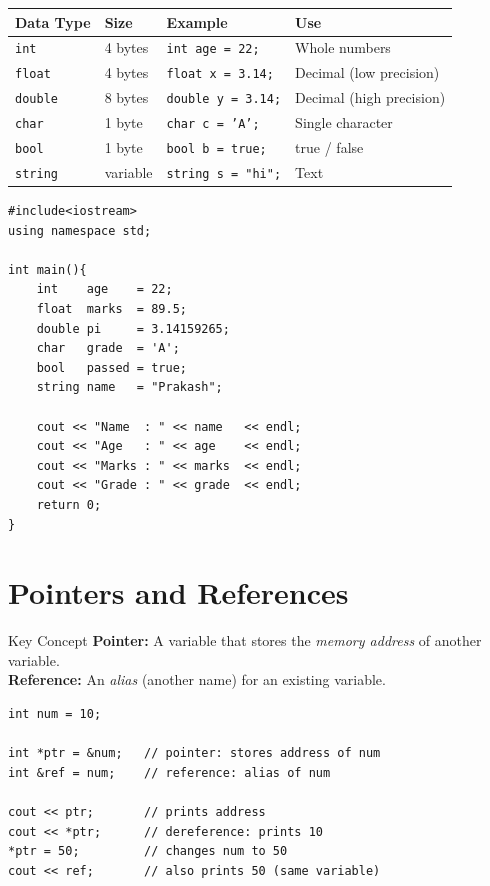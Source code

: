 \documentclass[12pt,a4paper]{report}
\begin{document}
\begin{center}
\begin{tabular}{|l|l|l|l|}
\hline
\textbf{Data Type} & \textbf{Size} & \textbf{Example} & \textbf{Use} \\
\hline
\texttt{int}    & 4 bytes  & \texttt{int age = 22;}     & Whole numbers \\
\texttt{float}  & 4 bytes  & \texttt{float x = 3.14;}  & Decimal (low precision) \\
\texttt{double} & 8 bytes  & \texttt{double y = 3.14;} & Decimal (high precision) \\
\texttt{char}   & 1 byte   & \texttt{char c = 'A';}    & Single character \\
\texttt{bool}   & 1 byte   & \texttt{bool b = true;}   & true / false \\
\texttt{string} & variable & \texttt{string s = "hi";} & Text \\
\hline
\end{tabular}
\end{center}

\begin{lstlisting}[caption={Variables and Data Types}]
#include<iostream>
using namespace std;

int main(){
    int    age    = 22;
    float  marks  = 89.5;
    double pi     = 3.14159265;
    char   grade  = 'A';
    bool   passed = true;
    string name   = "Prakash";

    cout << "Name  : " << name   << endl;
    cout << "Age   : " << age    << endl;
    cout << "Marks : " << marks  << endl;
    cout << "Grade : " << grade  << endl;
    return 0;
}
\end{lstlisting}

\section{Pointers and References}

\begin{conceptbox}{Key Concept}
\textbf{Pointer:} A variable that stores the \textit{memory address} of another variable.\\[4pt]
\textbf{Reference:} An \textit{alias} (another name) for an existing variable.
\end{conceptbox}

\begin{lstlisting}[caption={Pointers and References}]
int num = 10;

int *ptr = &num;   // pointer: stores address of num
int &ref = num;    // reference: alias of num

cout << ptr;       // prints address
cout << *ptr;      // dereference: prints 10
*ptr = 50;         // changes num to 50
cout << ref;       // also prints 50 (same variable)
\end{lstlisting}
\end{document}
